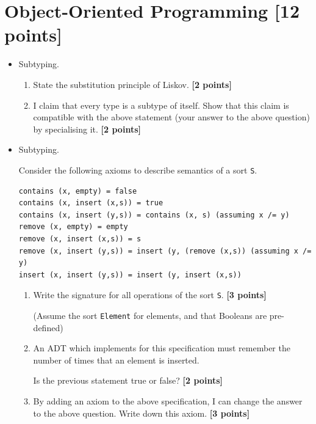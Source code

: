 \documentclass{article}
\begin{document}
\newpage
\section{Object-Oriented Programming [12 points]}

\begin{itemize}

\item Subtyping.

\begin{enumerate}
\item State the substitution principle of Liskov. \hfill{\textbf{[2 points]}}

\item I claim that every type is a subtype of itself. Show that this claim is compatible with 
  the above statement (your answer to the above question) by specialising it. \hfill{\textbf{[2 points]}}
\end{enumerate}

\item Subtyping.

Consider the following axioms to describe semantics of a sort
\verb!S!.

\begin{verbatim}
contains (x, empty) = false
contains (x, insert (x,s)) = true
contains (x, insert (y,s)) = contains (x, s) (assuming x /= y)
remove (x, empty) = empty
remove (x, insert (x,s)) = s
remove (x, insert (y,s)) = insert (y, (remove (x,s)) (assuming x /= y)
insert (x, insert (y,s)) = insert (y, insert (x,s))
\end{verbatim}

\begin{enumerate}
\item 
Write the signature for all operations of the sort \verb!S!. \hfill{\textbf{[3 points]}}

(Assume the sort \verb!Element! for elements, and that Booleans are
pre-defined) 

\item An ADT which implements for this specification must remember the
  number of times that an element is inserted.

Is the previous statement true or false? \hfill{\textbf{[2 points]}}

\item 
By adding an axiom to the above specification, I can change the
answer to the above question. Write down this axiom. \hfill{\textbf{[3 points]}}
\end{enumerate}


\end{itemize}
\end{document}
